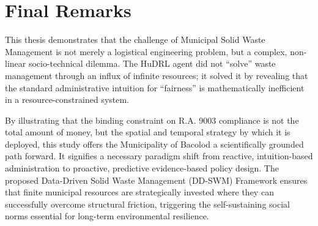 \section{Final Remarks}

This thesis demonstrates that the challenge of Municipal Solid Waste Management is not merely a logistical engineering problem, but a complex, non-linear socio-technical dilemma. The HuDRL agent did not ``solve'' waste management through an influx of infinite resources; it solved it by revealing that the standard administrative intuition for ``fairness'' is mathematically inefficient in a resource-constrained system.

By illustrating that the binding constraint on R.A. 9003 compliance is not the total amount of money, but the spatial and temporal strategy by which it is deployed, this study offers the Municipality of Bacolod a scientifically grounded path forward. It signifies a necessary paradigm shift from reactive, intuition-based administration to proactive, predictive evidence-based policy design. The proposed Data-Driven Solid Waste Management (DD-SWM) Framework ensures that finite municipal resources are strategically invested where they can successfully overcome structural friction, triggering the self-sustaining social norms essential for long-term environmental resilience.
